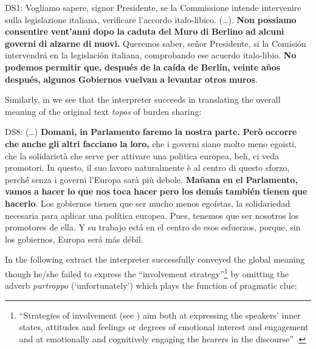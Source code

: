 \documentclass[output=paper]{langscibook}
\begin{document}
\ea\label{ex:mori:19}
\ea
DS1: Vogliamo sapere, signor Presidente, se la Commissione intende intervenire sulla legislazione italiana, verificare l'accordo italo-libico. (\ldots). \textbf{Non} \textbf{possiamo} \textbf{consentire} \textbf{vent'anni} \textbf{dopo} \textbf{la} \textbf{caduta} \textbf{del} \textbf{Muro} \textbf{di} \textbf{Berlino} \textbf{ad} \textbf{alcuni} \textbf{governi} \textbf{di} \textbf{alzarne} \textbf{di} \textbf{nuovi.}
\ex
Queremos saber, señor Presidente, si la Comisión intervendrá en la legislación italiana, comprobando ese acuerdo italo-libio. \textbf{No} \textbf{podemos} \textbf{permitir} \textbf{que,} \textbf{después} \textbf{de} \textbf{la} \textbf{caída} \textbf{de} \textbf{Berlín,} \textbf{veinte} \textbf{años} \textbf{después,} \textbf{algunos} \textbf{Gobiernos} \textbf{vuelvan} \textbf{a} \textbf{levantar} \textbf{otros} \textbf{muros}.
\z
\z

Similarly, in  we see that the interpreter succeeds in translating the overall meaning of the original text \textit{topos} of burden sharing:

\ea\label{ex:mori:20}
\ea
DS8: (\ldots) \textbf{Domani,} \textbf{in} \textbf{Parlamento} \textbf{faremo} \textbf{la} \textbf{nostra} \textbf{parte.} \textbf{Però} \textbf{occorre} \textbf{che} \textbf{anche} \textbf{gli} \textbf{altri} \textbf{facciano} \textbf{la} \textbf{loro,} che i governi siano molto meno egoisti, che la solidarietà che serve per attivare una politica europea, beh, ci veda promotori. In questo, il suo lavoro naturalmente è al centro di questo sforzo, perché senza i governi l'Europa sarà più debole.
\ex
\textbf{Mañana} \textbf{en} \textbf{el} \textbf{Parlamento,} \textbf{vamos} \textbf{a} \textbf{hacer} \textbf{lo} \textbf{que} \textbf{nos} \textbf{toca} \textbf{hacer} \textbf{pero} \textbf{los} \textbf{demás} \textbf{también} \textbf{tienen} \textbf{que} \textbf{hacerlo}. Los gobiernos tienen que ser mucho menos egoístas, la solidariedad necesaria para aplicar una política europea. Pues, tenemos que ser nosotros los promotores de ella. Y su trabajo está en el centro de esos esfuerzos, porque, sin los gobiernos, Europa será más débil. 
\z
\z

In the following extract  the interpreter successfully conveyed the global meaning though he/she failed to express the “involvement strategy”\footnote{“Strategies of involvement (see \citealt[9--35]{Tannen1989}) aim both at expressing the speakers’ inner states, attitudes and feelings or degrees of emotional interest and engagement and at emotionally and cognitively engaging the hearers in the discourse” \citep[81]{ReisiglWodak2001}.} by omitting the adverb \textit{purtroppo} (‘unfortunately’) which plays the function of pragmatic clue:
\end{document}
